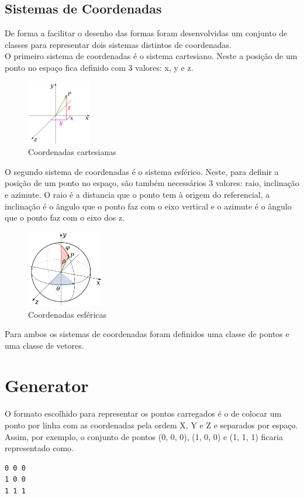 \documentclass[a4paper]{report}
\begin{document}
\section{Sistemas de Coordenadas}
De forma a facilitar o desenho das formas foram desenvolvidas um conjunto de
classes para representar dois sistemas distintos de coordenadas.\\
O primeiro sistema de coordenadas é o sistema cartesiano. Neste a posição de um
ponto no espaço fica definido com 3 valores: x, y e z.\\
\begin{figure}[H]
    \centering 
    \includegraphics[width=0.25\textwidth]{images/Coord_XYZ.png}  
    \caption{Coordenadas cartesianas}
    \label{fig:coord_xyz}
\end{figure}
O segundo sistema de coordenadas é o sistema esférico. Neste, para definir a
posição de um ponto no espaço, são também necessários 3 valores: raio,
inclinação e azimute. O raio é a distancia que o ponto tem à origem do
referencial, a inclinação é o ângulo que o ponto faz com o eixo vertical e o
azimute é o ângulo que o ponto faz com o eixo dos z.
\begin{figure}[H]
    \centering 
    \includegraphics[width=0.3\textwidth]{images/Spherical_Coordinates.png}  
    \caption{Coordenadas esféricas}
    \label{fig:spherical_coordinates}
\end{figure}
Para ambos os sistemas de coordenadas foram definidos uma classe de pontos e uma
classe de vetores.

\chapter{Generator}
O formato escolhido para representar os pontos carregados é o de colocar um
ponto por linha com as coordenadas pela ordem X, Y e Z e separados por espaço.\\
Assim, por exemplo, o conjunto de pontos (0, 0, 0), (1, 0, 0) e (1, 1, 1)
ficaria representado como.
\begin{lstlisting}
0 0 0
1 0 0
1 1 1
\end{lstlisting}
\end{document}
